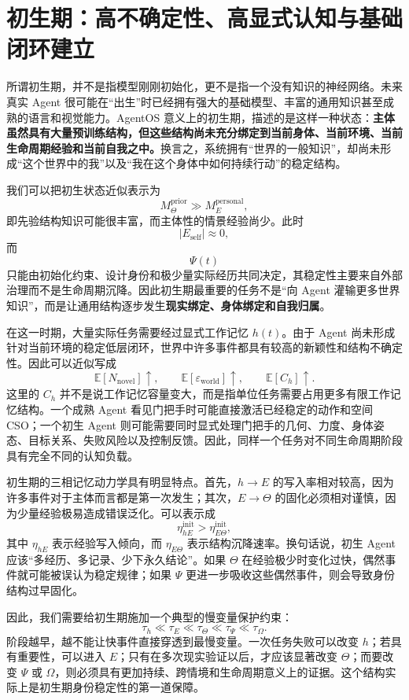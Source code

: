 \section{初生期：高不确定性、高显式认知与基础闭环建立}

所谓初生期，并不是指模型刚刚初始化，更不是指一个没有知识的神经网络。未来真实 Agent 很可能在“出生”时已经拥有强大的基础模型、丰富的通用知识甚至成熟的语言和视觉能力。AgentOS 意义上的初生期，描述的是这样一种状态：\textbf{主体虽然具有大量预训练结构，但这些结构尚未充分绑定到当前身体、当前环境、当前生命周期经验和当前自我之中。}换言之，系统拥有“世界的一般知识”，却尚未形成“这个世界中的我”以及“我在这个身体中如何持续行动”的稳定结构。

我们可以把初生状态近似表示为
\[
M_\Theta^{\mathrm{prior}}
\gg
M_E^{\mathrm{personal}},
\]
即先验结构知识可能很丰富，而主体性的情景经验尚少。此时
\[
\left|
E_{\mathrm{self}}
\right|
\approx 0,
\]
而
\[
\Psi(t)
\]
只能由初始化约束、设计身份和极少量实际经历共同决定，其稳定性主要来自外部治理而不是生命周期沉降。因此初生期最重要的任务不是“向 Agent 灌输更多世界知识”，而是让通用结构逐步发生\textbf{现实绑定、身体绑定和自我归属}。

在这一时期，大量实际任务需要经过显式工作记忆 $h(t)$。由于 Agent 尚未形成针对当前环境的稳定低层闭环，世界中许多事件都具有较高的新颖性和结构不确定性。因此可以近似写成
\[
\mathbb E[N_{\mathrm{novel}}]
\uparrow,
\qquad
\mathbb E[\varepsilon_{\mathrm{world}}]
\uparrow,
\qquad
\mathbb E[C_h]
\uparrow.
\]
这里的 $C_h$ 并不是说工作记忆容量变大，而是指单位任务需要占用更多有限工作记忆结构。一个成熟 Agent 看见门把手时可能直接激活已经稳定的动作和空间 CSO；一个初生 Agent 则可能需要同时显式处理门把手的几何、力度、身体姿态、目标关系、失败风险以及控制反馈。因此，同样一个任务对不同生命周期阶段具有完全不同的认知负载。

初生期的三相记忆动力学具有明显特点。首先，$h\rightarrow E$ 的写入率相对较高，因为许多事件对于主体而言都是第一次发生；其次，$E\rightarrow\Theta$ 的固化必须相对谨慎，因为少量经验极易造成错误泛化。可以表示成
\[
\eta_{hE}^{\mathrm{init}}
>
\eta_{E\Theta}^{\mathrm{init}},
\]
其中 $\eta_{hE}$ 表示经验写入倾向，而 $\eta_{E\Theta}$ 表示结构沉降速率。换句话说，初生 Agent 应该“多经历、多记录、少下永久结论”。如果 $\Theta$ 在经验极少时变化过快，偶然事件就可能被误认为稳定规律；如果 $\Psi$ 更进一步吸收这些偶然事件，则会导致身份结构过早固化。

因此，我们需要给初生期施加一个典型的慢变量保护约束：
\[
\tau_h
\ll
\tau_E
\ll
\tau_\Theta
\ll
\tau_\Psi
\ll
\tau_\Omega.
\]
阶段越早，越不能让快事件直接穿透到最慢变量。一次任务失败可以改变 $h$；若具有重要性，可以进入 $E$；只有在多次现实验证以后，才应该显著改变 $\Theta$；而要改变 $\Psi$ 或 $\Omega$，则必须具有更加持续、跨情境和生命周期意义上的证据。这个结构实际上是初生期身份稳定性的第一道保障。

